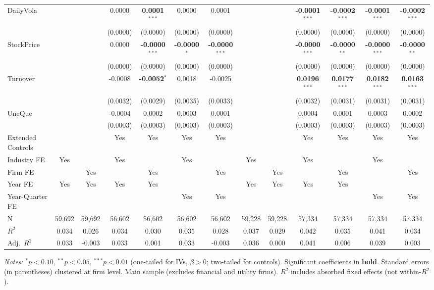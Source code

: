 \documentclass[11pt,a4paper]{article}
\begin{document}
\begin{table}[htbp]
\begin{tabular}{lcccccccccccc}
DailyVola &  &  & 0.0000 & \textbf{0.0001}$^{***}$ & 0.0000 & 0.0001 &  &  & \textbf{-0.0001}$^{***}$ & \textbf{-0.0002}$^{***}$ & \textbf{-0.0001}$^{***}$ & \textbf{-0.0002}$^{***}$ \\
 &  &  & (0.0000) & (0.0000) & (0.0000) & (0.0000) &  &  & (0.0000) & (0.0000) & (0.0000) & (0.0000) \\
StockPrice &  &  & 0.0000 & \textbf{-0.0000}$^{***}$ & \textbf{-0.0000}$^{*}$ & \textbf{-0.0000}$^{***}$ &  &  & \textbf{-0.0000}$^{***}$ & \textbf{-0.0000}$^{**}$ & \textbf{-0.0000}$^{***}$ & \textbf{-0.0000}$^{**}$ \\
 &  &  & (0.0000) & (0.0000) & (0.0000) & (0.0000) &  &  & (0.0000) & (0.0000) & (0.0000) & (0.0000) \\
Turnover &  &  & -0.0008 & \textbf{-0.0052}$^{*}$ & 0.0018 & -0.0025 &  &  & \textbf{0.0196}$^{***}$ & \textbf{0.0177}$^{***}$ & \textbf{0.0182}$^{***}$ & \textbf{0.0163}$^{***}$ \\
 &  &  & (0.0032) & (0.0029) & (0.0035) & (0.0033) &  &  & (0.0032) & (0.0031) & (0.0031) & (0.0031) \\
UncQue &  &  & -0.0004 & 0.0002 & 0.0003 & 0.0001 &  &  & 0.0004 & 0.0001 & 0.0003 & 0.0002 \\
 &  &  & (0.0003) & (0.0003) & (0.0003) & (0.0003) &  &  & (0.0003) & (0.0003) & (0.0003) & (0.0003) \\
\midrule
Extended Controls &  &  & Yes & Yes & Yes & Yes &  &  & Yes & Yes & Yes & Yes \\
Industry FE & Yes &  & Yes &  & Yes &  & Yes &  & Yes &  & Yes &  \\
Firm FE &  & Yes &  & Yes &  & Yes &  & Yes &  & Yes &  & Yes \\
Year FE & Yes & Yes & Yes & Yes &  &  & Yes & Yes & Yes & Yes &  &  \\
Year-Quarter FE &  &  &  &  & Yes & Yes &  &  &  &  & Yes & Yes \\
\midrule
N & 59,692 & 59,692 & 56,602 & 56,602 & 56,602 & 56,602 & 59,228 & 59,228 & 57,334 & 57,334 & 57,334 & 57,334 \\
$R^2$ & 0.034 & 0.026 & 0.034 & 0.030 & 0.035 & 0.028 & 0.037 & 0.029 & 0.042 & 0.035 & 0.041 & 0.034 \\
Adj.~$R^2$ & 0.033 & -0.003 & 0.033 & 0.001 & 0.033 & -0.003 & 0.036 & 0.000 & 0.041 & 0.006 & 0.039 & 0.003 \\
\bottomrule
\end{tabular}
\begin{minipage}{\linewidth}
\vspace{2pt}\scriptsize
\textit{Notes:} $^{*}p<0.10$, $^{**}p<0.05$, $^{***}p<0.01$ (one-tailed for IVs, $\beta > 0$; two-tailed for controls).
 Significant coefficients in \textbf{bold}.
 Standard errors (in parentheses) clustered at firm level.
 Main sample (excludes financial and utility firms).
 $R^2$ includes absorbed fixed effects (not within-$R^2$).
\end{minipage}
\end{table}
\end{document}
